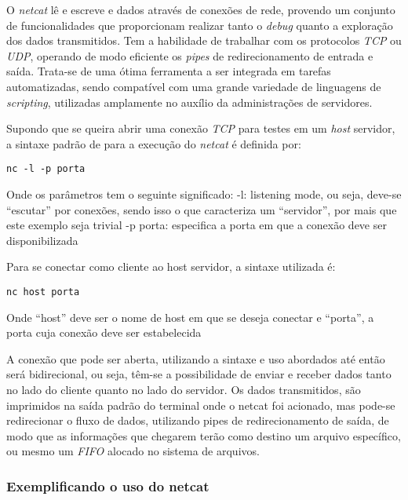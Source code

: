 O \textit{netcat} lê e escreve e dados através de conexões de rede, provendo um conjunto de funcionalidades que proporcionam realizar tanto o \textit{debug} quanto a exploração dos dados transmitidos. Tem a habilidade de trabalhar com os protocolos \textit{TCP} ou \textit{UDP}, operando de modo eficiente os \textit{pipes} de redirecionamento de entrada e saída. Trata-se de uma ótima ferramenta a ser integrada em tarefas automatizadas, sendo compatível com uma grande variedade de linguagens de \textit{scripting}, utilizadas amplamente no auxílio da administrações de servidores.

Supondo que se queira abrir uma conexão \textit{TCP} para testes em um \textit{host} servidor, a sintaxe padrão de para a execução do \textit{netcat} é definida por:

\scriptsize
\begin{verbatim}
nc -l -p porta
\end{verbatim}
\normalsize

Onde os parâmetros tem o seguinte significado:
-l: listening mode, ou seja, deve-se ``escutar'' por conexões, sendo isso o que caracteriza um ``servidor'', por mais que este exemplo seja trivial
-p porta: especifica a porta em que a conexão deve ser disponibilizada

Para se conectar como cliente ao host servidor, a sintaxe utilizada é:

\scriptsize
\begin{verbatim}
nc host porta
\end{verbatim}
\normalsize

Onde ``host'' deve ser o nome de host em que se deseja conectar e ``porta'', a porta cuja conexão deve ser estabelecida

A conexão que pode ser aberta, utilizando a sintaxe e uso abordados até então será bidirecional, ou seja, têm-se a possibilidade de enviar e receber dados tanto no lado do cliente quanto no lado do servidor. Os dados transmitidos, são imprimidos na saída padrão do terminal onde o netcat foi acionado, mas pode-se redirecionar o fluxo de dados, utilizando pipes de redirecionamento de saída, de modo que as informações que chegarem terão como destino um arquivo específico, ou mesmo um \textit{FIFO} alocado no sistema de arquivos.


\subsubsection{Exemplificando o uso do netcat}

